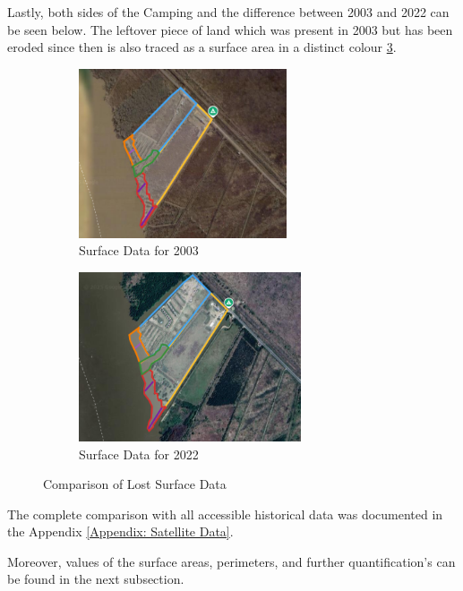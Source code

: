 Lastly, both sides of the Camping and the difference between 2003 and 2022 can be seen below. The leftover piece of land which was present in 2003 but has been eroded since then is also traced as a surface area in a distinct colour \ref{fig:surfacelost_comparison}. 

\begin{figure}[H]
    \centering
    \begin{subfigure}[b]{0.45\textwidth} %
        \includegraphics[width=\linewidth, height=5cm]{figures/appendix-g/delen2003.png}
        \caption{Surface Data for 2003}
        \label{fig:surface2003.1}
    \end{subfigure}
    \hfill
    \begin{subfigure}[b]{0.45\textwidth} %
        \includegraphics[width=\linewidth, height=5cm]{figures/appendix-g/delen2022.png}
        \caption{Surface Data for 2022}
        \label{fig:surface2022.1}
    \end{subfigure}
    \caption{Comparison of Lost Surface Data}
    \label{fig:surfacelost_comparison}
\end{figure}


The complete comparison with all accessible historical data was documented in the Appendix \ref{Appendix: Satellite Data}.

Moreover, values of the surface areas, perimeters, and further quantification's can be found in the next subsection.


